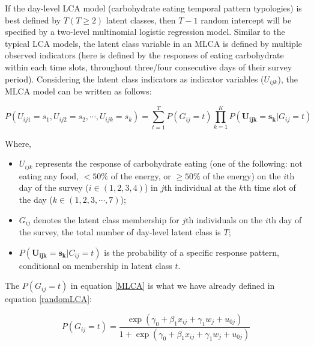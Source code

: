 If the day-level LCA model (carbohydrate eating temporal pattern typologies) is best defined by $T (T \geqslant 2)$ latent classes, then $T-1$ random intercept will be specified by a two-level multinomial logistic regression model. Similar to the typical LCA models, the latent class variable in an MLCA is defined by multiple observed indicators (here is defined by the responses of eating carbohydrate within each time slots, throughout three/four consecutive days of their survey period). Considering the latent class indicators as indicator variables ($U_{ijk}$), the MLCA model can be written as follows:\vspace{-1cm}

\begin{equation}
P(U_{ij1} = s_1, U_{ij2} = s_2, \cdots, U_{ijk} = s_{k}) = \sum_{t=1}^{T}P(G_{ij}=t)\prod_{k=1}^{K}P(\mathbf{U_{ijk} = s_k} | G_{ij} = t)
\label{MLCA}
\end{equation}
\vspace{-0.8cm}


Where, 

\begin{itemize}
	\item $ U_{ijk} $ represents the response of carbohydrate eating (one of the following: not eating any food, $< 50\%$ of the energy, or $\geqslant 50\%$ of the energy) on the $i$th day of the survey ($i \in (1,2,3,4)$) in $j$th individual at the $k$th time slot of the day ($k \in (1, 2, 3, \cdots, 7)$);
	\item $G_{ij}$ denotes the latent class membership for $j$th individuals on the $i$th day of the survey, the total number of day-level latent class is $T$;
	\item $P(\mathbf{U_{ijk} = s_k}|C_{ij} = t)$ is the probability of a specific response pattern, conditional on membership in latent class $t$.
\end{itemize}


The $P(G_{ij} = t)$ in equation \ref{MLCA} is what we have already defined in equation \ref{randomLCA}: \vspace{-0.3cm} 

\begin{equation}
P(G_{ij} = t) = \frac{\exp{(\gamma_0 + \beta_{1}x_{ij} + \gamma_1 w_j + u_{0j})}}{1 + \exp{(\gamma_0 + \beta_{1}x_{ij} + \gamma_1 w_j + u_{0j})}} 
\end{equation}


